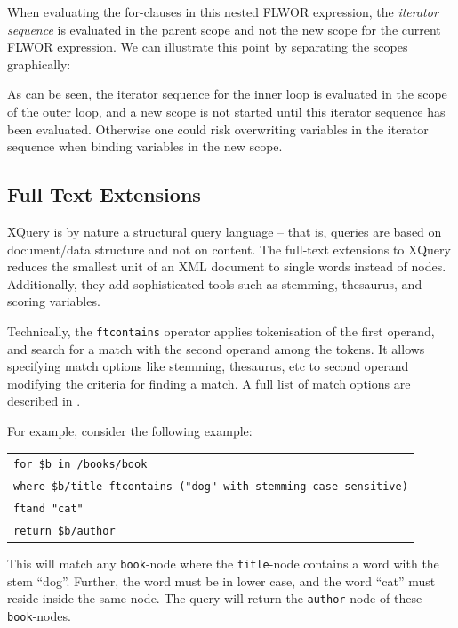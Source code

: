 When evaluating the for-clauses in this nested FLWOR expression, the
\textit{iterator sequence} is evaluated in the parent scope and not the
new scope for the current FLWOR expression. We can illustrate this point by
separating the scopes graphically:
\begin{figure}
\centering
{}
\end{figure}

As can be seen, the iterator sequence for the inner loop is evaluated in the
scope of the outer loop, and a new scope is not started until this iterator
sequence has been evaluated. Otherwise one could risk overwriting variables in
the iterator sequence when binding variables in the new scope.


\subsection{Full Text Extensions}
\label{sect:theory:xquery:fulltext_ext}
XQuery is by nature a structural query language -- that is, queries are based on
document/data structure and not on content. The full-text extensions to XQuery
reduces the smallest unit of an XML document to single words instead of nodes.
Additionally, they add sophisticated tools such as stemming, thesaurus, and
scoring variables.

Technically, the \verb!ftcontains! operator applies tokenisation of the first operand, and search for a match with
the second operand among the tokens. It allows specifying match options like stemming, thesaurus, etc to second
operand modifying the criteria for finding a match. A full list of match options are described in \cite{w3c01}.

For example, consider the following example:
\begin{center}
\begin{tabular}{l}
\texttt{for \$b in /books/book} \\
\texttt{where \$b/title ftcontains ("dog" with stemming case sensitive)} \\ \quad\quad\quad
\texttt{ftand "cat"} \\
\texttt{return \$b/author}
\end{tabular}
\end{center}
This will match any \texttt{book}-node where the \texttt{title}-node contains a word with the stem ``dog''.
Further, the word must be in lower case, and the word ``cat'' must reside inside the same node. The query will
return the \texttt{author}-node of these \texttt{book}-nodes. 

